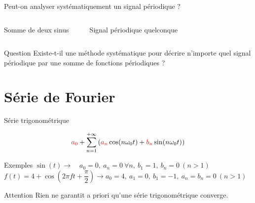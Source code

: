 \documentclass[aspectratio=43,10pt]{beamer}
\newcommand{\slidefig}[2]{%
\begin{center}
\resizebox{#1}{!}{}
\end{center}
}
\begin{document}
\begin{frame}{Peut-on analyser systématiquement un signal périodique ?}
    \begin{columns}
        \begin{center}\small Somme de deux sinus\end{center}
        \slidefig{\textwidth}{signal-composite.tex}
        \begin{center}\small Signal périodique quelconque\end{center}
        \slidefig{\textwidth}{signal-chaotic.tex}
    \end{columns}
    \begin{alertblock}{Question}
        Existe-t-il une méthode systématique pour décrire n'importe
        quel signal périodique par une somme de fonctions périodiques ?
    \end{alertblock}
\end{frame}

\section{Série de Fourier}

\begin{frame}{Série trigonométrique}
    \begin{overprint}

    \begin{definition}
        \[
            {\color{red}a_0} + \sum_{n=1}^{+\infty}\left({\color{red}a_n}\cos(n\omega_0 t)+{\color{red}b_n}\sin(n\omega_0 t)\right)
        \]
    \end{definition}

    \begin{exampleblock}{Exemples}
        \small
        $\sin(t) \to \quad a_0=0,\ a_n=0\ \forall n,\ b_1=1,\ b_n=0\ (n>1)$
        \\[1em]
        $f(t)=4+\cos\!\left(2\pi f t+\dfrac{\pi}{2}\right) \to a_0=4,\ a_1=0,\ b_1=-1,\ a_n=b_n=0\ (n>1)$
    \end{exampleblock}
    \begin{alertblock}{Attention}
        Rien ne garantit a priori qu'une série trigonométrique converge.
    \end{alertblock}
    \end{overprint}
\end{frame}
\end{document}
